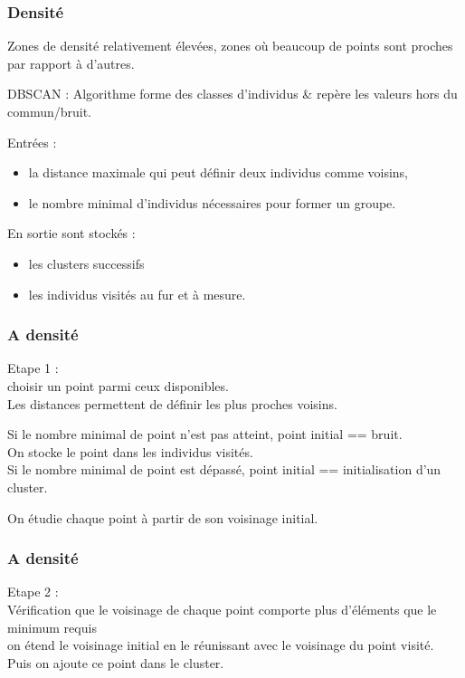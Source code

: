 \begin{frame}
  \frametitle{Densité}
 Zones de densité relativement élevées, zones où beaucoup de points sont proches par rapport à d’autres.

DBSCAN : Algorithme forme des classes d’individus \& repère les valeurs hors du commun/bruit. 

Entrées :
\begin{itemize}
\item {} la distance maximale qui peut définir deux individus comme voisins,
\item {} le nombre minimal d’individus nécessaires pour former un groupe.
\end{itemize}

En sortie sont stockés :
\begin{itemize}
\item {} les clusters successifs
\item {} les individus visités au fur et à mesure.
\end{itemize}

\end{frame}

\begin{frame}
  \frametitle{A densité}
 Etape 1 :\\
 choisir un point parmi ceux disponibles. \\
 Les distances permettent de définir les plus proches voisins. 


\textcolor{red}{} Si le nombre minimal de point n'est pas atteint, point initial == bruit. \\
On stocke le point dans les individus visités.\\

\textcolor{green}{} Si le nombre minimal de point est dépassé, point initial == initialisation d'un cluster.

 On étudie chaque point à partir de son voisinage initial. \\
\end{frame}

\begin{frame}
  \frametitle{A densité}
 Etape 2 :\\

 Vérification que le voisinage de chaque point comporte plus d'éléments que le minimum requis \\
 on étend le voisinage initial en le réunissant avec le voisinage du point visité.\\

 Puis on ajoute ce point dans le cluster. \\
\end{frame}

